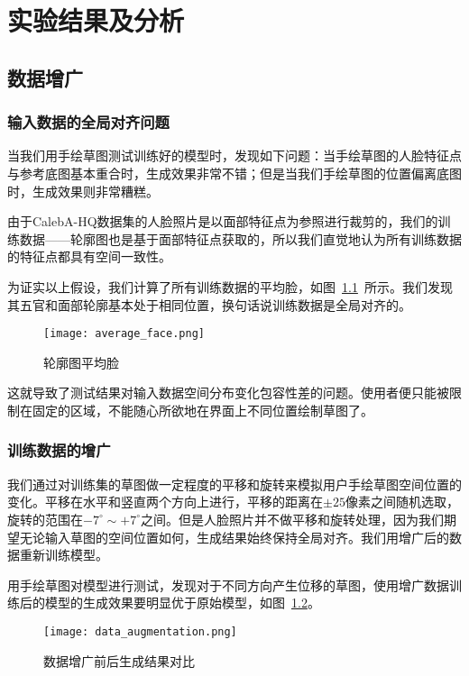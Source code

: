 
\chapter{实验结果及分析}

\section{数据增广}

\subsection{输入数据的全局对齐问题}

当我们用手绘草图测试训练好的模型时，发现如下问题：当手绘草图的人脸特征点与参考底图基本重合时，生成效果非常不错；但是当我们手绘草图的位置偏离底图时，生成效果则非常糟糕。

由于CalebA-HQ数据集的人脸照片是以面部特征点为参照进行裁剪的，我们的训练数据——轮廓图也是基于面部特征点获取的，所以我们直觉地认为所有训练数据的特征点都具有空间一致性。

为证实以上假设，我们计算了所有训练数据的平均脸，如图~\ref{fig:average_face}~所示。我们发现其五官和面部轮廓基本处于相同位置，换句话说训练数据是全局对齐的。
\begin{figure}[htb]
	\centering
	\texttt{[image: average\_face.png]}
	\caption{轮廓图平均脸}
	\label{fig:average_face}
\end{figure}

这就导致了测试结果对输入数据空间分布变化包容性差的问题。使用者便只能被限制在固定的区域，不能随心所欲地在界面上不同位置绘制草图了。

\subsection{训练数据的增广}

我们通过对训练集的草图做一定程度的平移和旋转来模拟用户手绘草图空间位置的变化。平移在水平和竖直两个方向上进行，平移的距离在$\pm 25$像素之间随机选取，旋转的范围在$-7^{\circ} \sim +7^{\circ}$之间。但是人脸照片并不做平移和旋转处理，因为我们期望无论输入草图的空间位置如何，生成结果始终保持全局对齐。我们用增广后的数据重新训练模型。

用手绘草图对模型进行测试，发现对于不同方向产生位移的草图，使用增广数据训练后的模型的生成效果要明显优于原始模型，如图~\ref{fig:data_augmentation}。
\begin{figure}[htb]
	\centering
	\texttt{[image: data\_augmentation.png]}
	\caption{数据增广前后生成结果对比}
	\label{fig:data_augmentation}
\end{figure}

